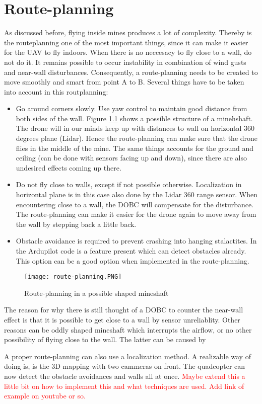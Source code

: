 \chapter{Route-planning} \label{ch:rp}
As discussed before, flying inside mines produces a lot of complexity. Thereby is the routeplanning one of the most important things, since it can make it easier for the UAV to fly indoors. When there is no neccesacy to fly close to a wall, do not do it. It remains possible to occur instability in combination of wind gusts and near-wall disturbances. Consequently, a route-planning needs to be created to move smoothly and smart from point A to B. Several things have to be taken into account in this routplanning:
\begin{itemize}
\item Go around corners slowly. Use yaw control to maintain good distance from both sides of the wall. Figure \ref{fig:routeplanning} shows a possible structure of a minehshaft. The drone will in our minds keep up with distances to wall on horizontal 360 degrees plane (Lidar). Hence the route-planning can make sure that the drone flies in the middle of the mine. The same things accounts for the ground and ceiling (can be done with sensors facing up and down), since there are also undesired effects coming up there.

\item Do not fly close to walls, except if not possible otherwise. Localization in horizontal plane is in this case also done by the Lidar 360 range sensor. When encountering close to a wall, the DOBC will compensate for the disturbance. The route-planning can make it easier for the drone again to move away from the wall by stepping back a little back.

\item Obstacle avoidance is required to prevent crashing into hanging stalactites. In the Ardupilot code is a feature present which can detect obstacles already. This option can be a good option when implemented in the route-planning.
\end{itemize}

\begin{figure}[H]
\centering
\texttt{[image: route-planning.PNG]}
\caption{Route-planning in a possible shaped mineshaft}
\label{fig:routeplanning}
\end{figure}

The reason for why there is still thought of a DOBC to counter the near-wall effect is that it is possible to get close to a wall by sensor unreliablity. Other reasons can be oddly shaped mineshaft which interrupts the airflow, or no other possibility of flying close to the wall. The latter can be caused by 


A proper route-planning can also use a localization method. A realizable way of doing is, is the 3D mapping with two cammeras on front. The quadcopter can now detect the obstacle avoidances and walls all at once. \textcolor{red}{Maybe extend this a little bit on how to implement this and what techniques are used. Add link of example on youtube or so.}



